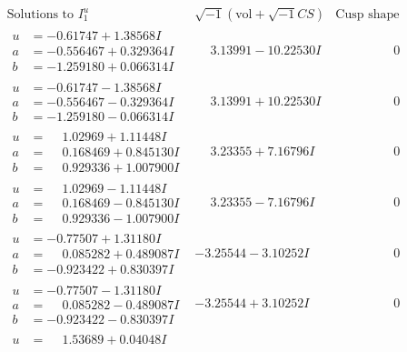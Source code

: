 \documentclass[1p]{elsarticle_modified}
\theoremstyle{definition}
\newcommand{\I}{\sqrt{-1}}
\begin{document}
$$\begin{array}{c|c|c}
\text{Solutions to }I^u_{1}& \I (\text{vol} + \sqrt{-1}CS) & \text{Cusp shape}\\
 \hline 
\begin{aligned}
u &= -0.61747 + 1.38568 I \\
a &= -0.556467 + 0.329364 I \\
b &= -1.259180 + 0.066314 I\end{aligned}
 & \phantom{-}3.13991 - 10.22530 I & \phantom{-0.000000 } 0 \\ \hline\begin{aligned}
u &= -0.61747 - 1.38568 I \\
a &= -0.556467 - 0.329364 I \\
b &= -1.259180 - 0.066314 I\end{aligned}
 & \phantom{-}3.13991 + 10.22530 I & \phantom{-0.000000 } 0 \\ \hline\begin{aligned}
u &= \phantom{-}1.02969 + 1.11448 I \\
a &= \phantom{-}0.168469 + 0.845130 I \\
b &= \phantom{-}0.929336 + 1.007900 I\end{aligned}
 & \phantom{-}3.23355 + 7.16796 I & \phantom{-0.000000 } 0 \\ \hline\begin{aligned}
u &= \phantom{-}1.02969 - 1.11448 I \\
a &= \phantom{-}0.168469 - 0.845130 I \\
b &= \phantom{-}0.929336 - 1.007900 I\end{aligned}
 & \phantom{-}3.23355 - 7.16796 I & \phantom{-0.000000 } 0 \\ \hline\begin{aligned}
u &= -0.77507 + 1.31180 I \\
a &= \phantom{-}0.085282 + 0.489087 I \\
b &= -0.923422 + 0.830397 I\end{aligned}
 & -3.25544 - 3.10252 I & \phantom{-0.000000 } 0 \\ \hline\begin{aligned}
u &= -0.77507 - 1.31180 I \\
a &= \phantom{-}0.085282 - 0.489087 I \\
b &= -0.923422 - 0.830397 I\end{aligned}
 & -3.25544 + 3.10252 I & \phantom{-0.000000 } 0 \\ \hline\begin{aligned}
u &= \phantom{-}1.53689 + 0.04048 I \\

\end{aligned}
\end{array}$$
\end{document}
